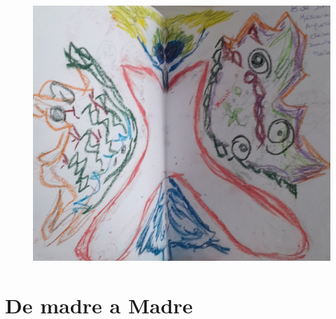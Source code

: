 \documentclass[12pt, a4paper, twoside]{book} %
\begin{document}
\clearpage

\begin{figure}[H]
	\centering
	\includegraphics[width=\textwidth]{./images/1f81324df39a29.jpg}
\end{figure}

\chapter{De madre a Madre}
\end{document}
